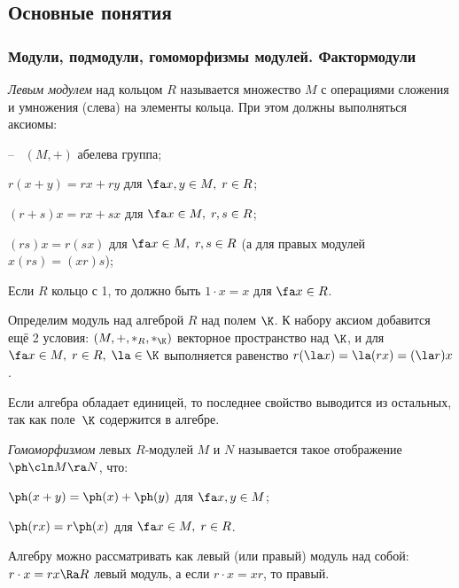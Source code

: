 \documentclass[a4paper]{article}
\begin{document}
\subsection{Основные понятия}

\subsubsection{Модули, подмодули, гомоморфизмы модулей. Фактормодули}

\begin{df}
\emph{Левым модулем} над кольцом $R$ называется множество $M$ с операциями сложения и умножения  (слева) на
элементы кольца. При этом должны выполняться аксиомы:

--~ $(M,+)$ абелева группа;

 $r(x+y)=rx+ry$ для $\fa x,y \in M, \; r \in R$;

 $(r+s)x=rx+sx$ для $\fa x \in M, \; r,s \in R$;

 $(rs)x=r(sx)$ для $\fa x \in M, \; r,s \in R$ (а для правых модулей $x(rs)=(xr)s$);

 Если $R$ кольцо с 1, то должно быть $1 \cdot x = x$ для $\fa x \in R$.
\end{df}

Определим модуль над алгеброй $R$ над полем $\K$. К набору аксиом добавится ещё 2 условия:
$(M,+,*_R,*_\K)$ векторное пространство над $\K$, и для $\fa x \in M, \; r \in R, \; \la \in \K$
выполняется  равенство $r(\la x)=\la(rx)=(\la r)x$.

\begin{note}
Если алгебра обладает единицей, то последнее свойство выводится из остальных, так как поле~$\K$  содержится в
алгебре.
\end{note}

\begin{df}
\emph{Гомоморфизмом} левых $R$-модулей $M$ и $N$ называется такое отображение $\ph\cln M \ra N$, что:

 $\ph(x+y)=\ph(x)+\ph(y)$ для $\fa x, y \in M$;

 $\ph(rx)=r\ph(x)$ для $\fa x \in M, \; r \in R$.
\end{df}

\begin{note}
Алгебру можно рассматривать как левый (или правый) модуль над собой: $r \cdot x = rx \Ra R$ левый
модуль, а если $r \cdot x = xr$, то правый.
\end{note}
\end{document}
